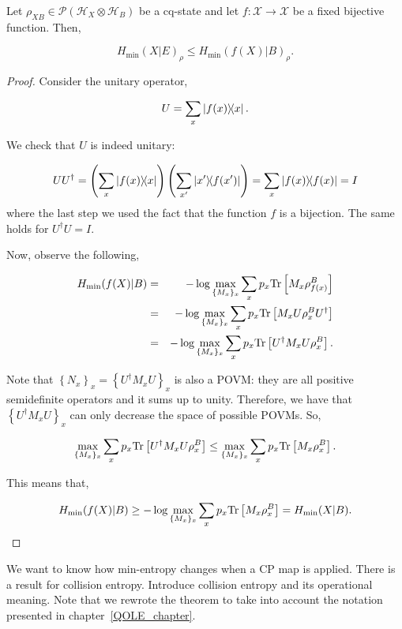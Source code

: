 \begin{lemma}
Let $\rho_{XB} \in \mathcal{P}(\mathcal{H}_{X}\otimes \mathcal{H}_B)$ be a cq-state and let $f:\mathcal{X} \rightarrow \mathcal{X} $ be a fixed bijective function. Then,

$$H_{\min}(X|E)_{\rho} \leq H_{\min}(f(X)|B)_{\rho}.$$
\label{lemma:bijectivefunction}
\end{lemma}
\begin{proof}
Consider the unitary operator,

$$U = \sum_x \ketbra{f(x)}{x}.$$ 

We check that $U$ is indeed unitary:

\begin{equation*}
U U^{\dagger} = \left(\sum_x \ketbra{f(x)}{x}\right)\left(\sum_{x'} \ketbra{x'}{f(x')}\right) 
= \sum_x \ketbra{f(x)} = I
\end{equation*}
where the last step we used the fact that the function $f$ is a bijection. The same holds for $U^{\dagger}U = I$.

Now, observe the following,

\begin{eqnarray*}
H_{\min}(f(X)|B) &=& -\log \max_{\{M_x\}_x} \sum_x p_x \text{Tr}\left[M_x \rho_{f(x)}^B\right]\\
&=& -\log \max_{\{M_x\}_x} \sum_x p_x \text{Tr}\left[M_x U \rho_{x}^B U^{\dagger}\right]\\
&=& -\log \max_{\{M_x\}_x} \sum_x p_x \text{Tr}\left[U^{\dagger} M_x U \rho_{x}^B \right]. 
\end{eqnarray*}

Note that $\left\{ N_x \right\}_x= \left\{U^{\dagger} M_x U\right\}_x$ is also a POVM: they are all positive semidefinite operators and it sums up to unity. Therefore, we have that $\left\{U^{\dagger} M_x U\right\}_x$ can only decrease the space of possible POVMs. So, 

$$\max_{\{M_x\}_x} \sum_x p_x \text{Tr}\left[U^{\dagger} M_x U \rho_{x}^B \right] \leq \max_{\{M_x\}_x} \sum_x p_x \text{Tr}\left[ M_x \rho_{x}^B \right].$$

This means that, 

\begin{equation*}
H_{\min}(f(X)|B) \geq -\log \max_{\{M_x\}_x} \sum_x p_x \text{Tr}\left[ M_x \rho_{x}^B \right] = H_{\min}(X|B).
\end{equation*}
\end{proof}




We want to know how min-entropy changes when a CP map is applied. There is a result for collision entropy. Introduce collision entropy and its operational meaning. Note that we rewrote the theorem to take into account the notation presented in chapter~\ref{QOLE_chapter}.



